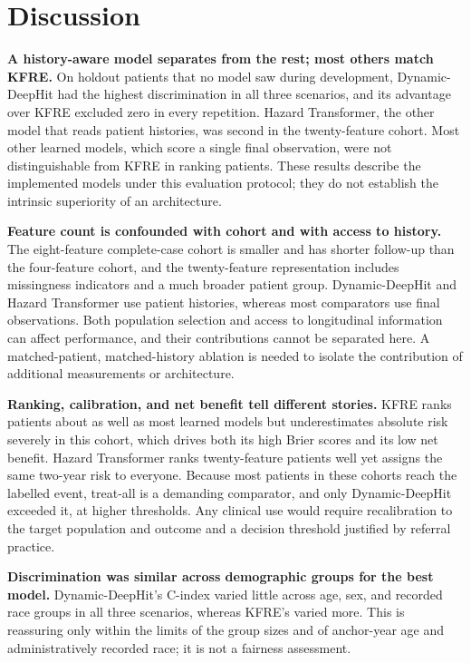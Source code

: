 
\section{Discussion}

\textbf{A history-aware model separates from the rest; most others match KFRE.} On holdout patients that no model saw during development, Dynamic-DeepHit had the highest discrimination in all three scenarios, and its advantage over KFRE excluded zero in every repetition. Hazard Transformer, the other model that reads patient histories, was second in the twenty-feature cohort. Most other learned models, which score a single final observation, were not distinguishable from KFRE in ranking patients. These results describe the implemented models under this evaluation protocol; they do not establish the intrinsic superiority of an architecture.

\textbf{Feature count is confounded with cohort and with access to history.} The eight-feature complete-case cohort is smaller and has shorter follow-up than the four-feature cohort, and the twenty-feature representation includes missingness indicators and a much broader patient group. Dynamic-DeepHit and Hazard Transformer use patient histories, whereas most comparators use final observations. Both population selection and access to longitudinal information can affect performance, and their contributions cannot be separated here. A matched-patient, matched-history ablation is needed to isolate the contribution of additional measurements or architecture.

\textbf{Ranking, calibration, and net benefit tell different stories.} KFRE ranks patients about as well as most learned models but underestimates absolute risk severely in this cohort, which drives both its high Brier scores and its low net benefit. Hazard Transformer ranks twenty-feature patients well yet assigns the same two-year risk to everyone. Because most patients in these cohorts reach the labelled event, treat-all is a demanding comparator, and only Dynamic-DeepHit exceeded it, at higher thresholds. Any clinical use would require recalibration to the target population and outcome and a decision threshold justified by referral practice.

\textbf{Discrimination was similar across demographic groups for the best model.} Dynamic-DeepHit's C-index varied little across age, sex, and recorded race groups in all three scenarios, whereas KFRE's varied more. This is reassuring only within the limits of the group sizes and of anchor-year age and administratively recorded race; it is not a fairness assessment.

